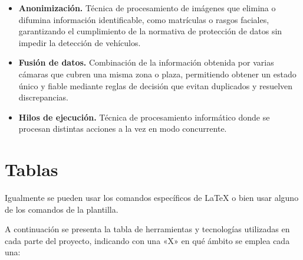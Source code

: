 \documentclass[12pt,a4paper]{article}
\begin{document}
\begin{itemize}
	\item \textbf{Anonimización.} Técnica de procesamiento de imágenes que elimina o difumina información identificable, como matrículas o rasgos faciales, garantizando el cumplimiento de la normativa de protección de datos sin impedir la detección de vehículos.
	\item \textbf{Fusión de datos.} Combinación de la información obtenida por varias cámaras que cubren una misma zona o plaza, permitiendo obtener un estado único y fiable mediante reglas de decisión que evitan duplicados y resuelven discrepancias.
	\item \textbf{Hilos de ejecución.} Técnica de procesamiento informático donde se procesan distintas acciones a la vez en modo concurrente.
\end{itemize}

\section{Tablas}

Igualmente se pueden usar los comandos específicos de \LaTeX{} o bien usar alguno de los comandos de la plantilla.

A continuación se presenta la tabla de herramientas y tecnologías utilizadas en cada parte del proyecto, indicando con una «X» en qué ámbito se emplea cada una:

\begin{table}[!h]
	\centering
	\caption{Herramientas y tecnologías utilizadas en cada parte del proyecto}
	\label{tab:herramientas}
\end{table}
\end{document}
